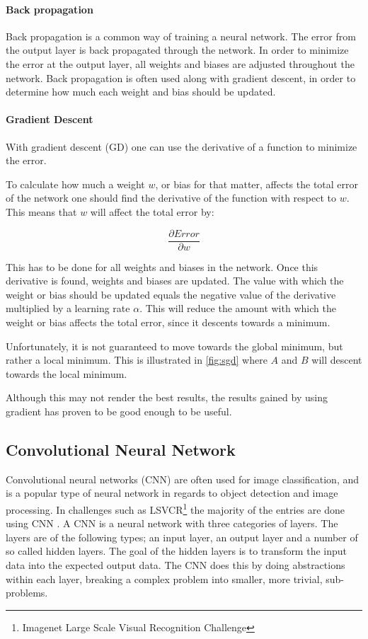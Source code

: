\paragraph{Back propagation}
Back propagation is a common way of training a neural network.
The error from the output layer is back propagated through the network.
In order to minimize the error at the output layer, all weights and biases are adjusted throughout the network.
Back propagation is often used along with gradient descent, in order to determine how much each weight and bias should be updated.

\paragraph{Gradient Descent}
With gradient descent (GD) one can use the derivative of a function to minimize the error.

To calculate how much a weight $w$, or bias for that matter, affects the total error of the network one should find the derivative of the function with respect to $w$.
This means that $w$ will affect the total error by:

$$\frac{\partial Error}{\partial w}$$

This has to be done for all weights and biases in the network.
Once this derivative is found, weights and biases are updated.
The value with which the weight or bias should be updated equals the negative value of the derivative multiplied by a learning rate $\alpha$.
This will reduce the amount with which the weight or bias affects the total error, since it descents towards a minimum.

Unfortunately, it is not guaranteed to move towards the global minimum, but rather a local minimum.
This is illustrated in \autoref{fig:sgd} where $A$ and $B$ will descent towards the local minimum.


Although this may not render the best results, the results gained by using gradient has proven to be good enough to be useful.

\subsection{Convolutional Neural Network}
\label{sec:cnn}
Convolutional neural networks (CNN) are often used for image classification, and is a popular type of neural network in regards to object detection and image processing.
In challenges such as LSVCR\footnote{Imagenet Large Scale Visual Recognition Challenge} the majority of the entries are done using CNN \cite{ILSVRC_Results}.  
A CNN is a neural network with three categories of layers.
The layers are of the following types; an input layer, an output layer and a number of so called hidden layers.
The goal of the hidden layers is to transform the input data into the expected output data.
The CNN does this by doing abstractions within each layer, breaking a complex problem into smaller, more trivial, sub-problems.


